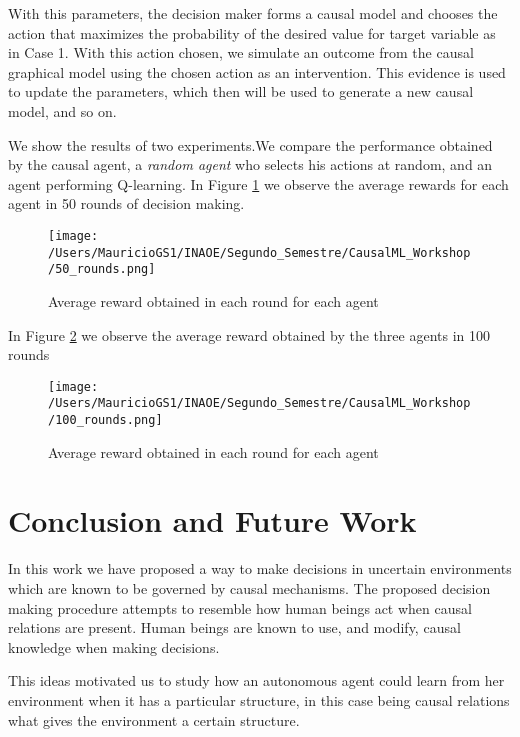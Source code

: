 \documentclass{article}
\begin{document}
With this parameters, the decision maker forms a causal model and chooses the action that maximizes the probability of the desired value for target variable as in Case 1.  With this action chosen, we simulate an outcome from the causal graphical model using the chosen action as an intervention. This evidence is used to update the parameters, which then will be used to generate a new causal model, and so on.

We show the results of two experiments.We compare the performance obtained by the causal agent, a \textit{random agent} who selects his actions at random, and an agent performing Q-learning. In Figure \ref{50_rounds} we observe the average rewards for each agent in 50 rounds of decision making.

\begin{figure}[ht]
\vskip 0.2in
\begin{center}
\centerline{\texttt{[image: /Users/MauricioGS1/INAOE/Segundo\_Semestre/CausalML\_Workshop/50\_rounds.png]}}
\caption{Average reward obtained in each round for each agent}
\label{50_rounds}
\end{center}
\vskip -0.2in
\end{figure}

In Figure \ref{100_rounds} we observe the average reward obtained by the three agents in 100 rounds 

\begin{figure}[ht]
\vskip 0.2in
\begin{center}
\centerline{\texttt{[image: /Users/MauricioGS1/INAOE/Segundo\_Semestre/CausalML\_Workshop/100\_rounds.png]}}
\caption{Average reward obtained in each round for each agent}
\label{100_rounds}
\end{center}
\vskip -0.2in
\end{figure}


\section{Conclusion and Future Work}
In this work we have proposed a way to make decisions in uncertain environments which are known to be governed by causal mechanisms. The proposed decision making procedure attempts to resemble how human beings act when causal relations are present. Human beings are known to use, and modify, causal knowledge when making decisions. 

This ideas motivated us to study how an autonomous agent could learn from her environment when it has a particular structure, in this case being causal relations what gives the environment a certain structure. 
\end{document}
